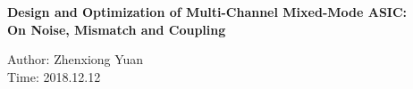 

\thispagestyle{empty}
\begin{center}
  \renewcommand{\baselinestretch}{2.00}
  \Large\bfseries\sffamily
  \vspace*{2cm}
    Design and Optimization of Multi-Channel Mixed-Mode ASIC: \\
    On Noise, Mismatch and Coupling
  \par
  \vfill
  \large\normalfont
  Author: Zhenxiong Yuan\\
  Time: 2018.12.12
\end{center}\par

\renewcommand{\baselinestretch}{1.00}\normalsize